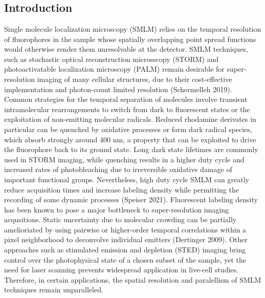 \documentclass{ucetd}
\begin{document}
\clearpage

\mainmatter

\chapter{}

\section{Introduction}

Single molecule localization microscopy (SMLM) relies on the temporal resolution of fluorophores in the sample whose spatially overlapping point spread functions would otherwise render them unresolvable at the detector. SMLM techniques, such as stochastic optical reconstruction microsscopy (STORM) and photoactivatable localization microscopy (PALM) remain desirable for super-resolution imaging of many cellular structures, due to their cost-effective implementation and photon-count limited resolution (Schermelleh 2019). Common strategies for the temporal separation of molecules involve transient intramolecular rearrangements to switch from dark to fluorescent states or the exploitation of non-emitting molecular radicals. Reduced rhodamine derivates in particular can be quenched by oxidative processes or form dark radical species, which absorb strongly around 400 nm, a property that can be exploited to drive the fluorophore back to its ground state. Long dark state lifetimes are commonly used in STORM imaging, while quenching results in a higher duty cycle and increased rates of photobleaching due to irreversible oxidative damage of important functional groups. Nevertheless, high duty cycle SMLM can greatly reduce acquisition times and increase labeling density while permitting the recording of some dynamic processes (Speiser 2021). Fluorescent labeling density has been known to pose a major bottleneck to super-resolution imaging acqusitions. Static uncertainty due to molecular crowding can be partially amelioriated by using pairwise or higher-order temporal correlations within a pixel neighborhood to deconvolve individual emitters (Dertinger 2009). Other approaches such as stimulated emission and depletion (STED) imaging bring control over the photophysical state of a chosen subset of the sample, yet the need for laser scanning prevents widespread application in live-cell studies. Therefore, in certain applications, the spatial resolution and paralellism of SMLM techniques remain unparalleled.
\end{document}

